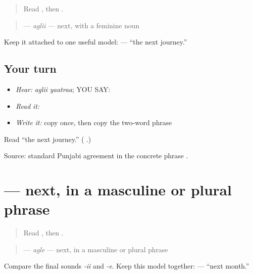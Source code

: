 \label{lesson:PA-C184-agli}



\begin{quote}
Read \textbf{}, then \textbf{}.
\end{quote}

\begin{grammarlens}[title={Grammar Lens: one concrete next-item phrase}]
\begin{quote}
\textbf{} — \emph{aglii} — next, with a feminine noun
\end{quote}

Keep it attached to one useful model: \textbf{ } — “the next journey.”
\end{grammarlens}

\subsection*{Your turn}
\begin{itemize}
\raggedright
  \item \emph{Hear:} \emph{aglii yaatraa}; YOU SAY: \textbf{ }
  \item \emph{Read it:} \textbf{ }
  \item \emph{Write it:} copy \textbf{} once, then copy the two-word phrase
\end{itemize}

\begin{tcolorbox}[breakable,colback=teal!4,colframe=teal!35!black,title={Before you move on}]
Read “the next journey.” (\textbf{ }.)

Source: standard Punjabi agreement in the concrete phrase \textbf{ }.
\end{tcolorbox}
\section[\texorpdfstring{\pa{ਅਗਲੇ} (agle)}{ਅਗਲੇ (agle)}]{ — next, in a masculine or plural phrase}

\label{lesson:PA-C184-agle}



\begin{quote}
Read \textbf{}, then \textbf{}.
\end{quote}

\begin{grammarlens}[title={Grammar Lens: change only the agreement ending}]
\begin{quote}
\textbf{} — \emph{agle} — next, in a masculine or plural phrase
\end{quote}

Compare the final sounds \emph{-ii} and \emph{-e}. Keep this model together: \textbf{ } — “next month.”
\end{grammarlens}

